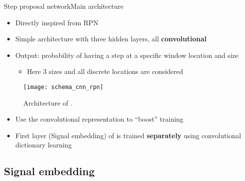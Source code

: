 \begin{frame}{Step proposal network}{Main architecture}

\begin{itemize}
    \item Directly inspired from RPN
    \item Simple architecture with three hidden layers, all \textbf{convolutional}
    \item Output: probability of having a step at a specific window location and size
    \begin{itemize}
    \item Here 3 sizes and all discrete locations are considered
    \end{itemize}
\end{itemize}

\begin{figure}[h]
    \begin{minipage}{\linewidth}
        \centering
        \texttt{[image: schema\_cnn\_rpn]}
        \caption{Architecture of \subalgo.}
    \end{minipage}
\end{figure}

\pause
\begin{itemize}
    \item Use the convolutional representation to ``boost'' training
    \item First layer (Signal embedding) of \subalgo is trained \textbf{separately} using convolutional dictionary learning
\end{itemize}
    
\end{frame}

\subsection{Signal embedding}



